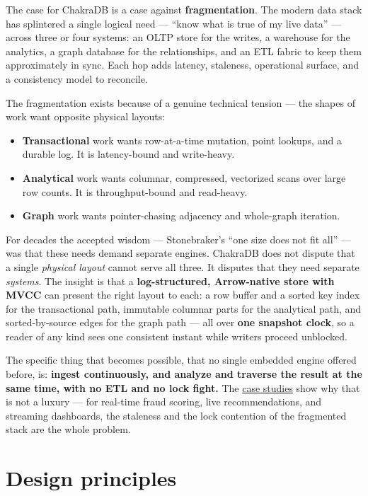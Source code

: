 \documentclass[
  11pt,
  openany]{book}
\providecommand{\tightlist}{%
  \setlength{\itemsep}{0pt}\setlength{\parskip}{0pt}}
\begin{document}
The case for ChakraDB is a case against \textbf{fragmentation}. The
modern data stack has splintered a single logical need --- ``know what
is true of my live data'' --- across three or four systems: an OLTP
store for the writes, a warehouse for the analytics, a graph database
for the relationships, and an ETL fabric to keep them approximately in
sync. Each hop adds latency, staleness, operational surface, and a
consistency model to reconcile.

The fragmentation exists because of a genuine technical tension --- the
shapes of work want opposite physical layouts:

\begin{itemize}
\tightlist
\item
  \textbf{Transactional} work wants row-at-a-time mutation, point
  lookups, and a durable log. It is latency-bound and write-heavy.
\item
  \textbf{Analytical} work wants columnar, compressed, vectorized scans
  over large row counts. It is throughput-bound and read-heavy.
\item
  \textbf{Graph} work wants pointer-chasing adjacency and whole-graph
  iteration.
\end{itemize}

For decades the accepted wisdom --- Stonebraker's ``one size does not
fit all'' --- was that these needs demand separate engines. ChakraDB
does not dispute that a single \emph{physical layout} cannot serve all
three. It disputes that they need separate \emph{systems}. The insight
is that a \textbf{log-structured, Arrow-native store with MVCC} can
present the right layout to each: a row buffer and a sorted key index
for the transactional path, immutable columnar parts for the analytical
path, and sorted-by-source edges for the graph path --- all over
\textbf{one snapshot clock}, so a reader of any kind sees one consistent
instant while writers proceed unblocked.

The specific thing that becomes possible, that no single embedded engine
offered before, is: \textbf{ingest continuously, and analyze and
traverse the result at the same time, with no ETL and no lock fight.}
The \href{../case-studies/fraud.md}{case studies} show why that is not a
luxury --- for real-time fraud scoring, live recommendations, and
streaming dashboards, the staleness and the lock contention of the
fragmented stack are the whole problem.

\section{Design principles}\label{design-principles}
\end{document}
